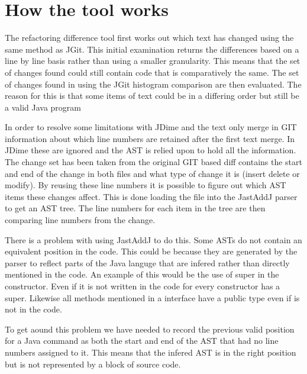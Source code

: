\section{How the tool works}

The refactoring difference tool first works out which text has changed using the same method as JGit.
This initial examination returns the differences based on a line by line basis rather than using a smaller granularity.
This means that the set of changes found could still contain code that is comparatively the same.
The set of changes found in using the JGit histogram comparison are then evaluated.
The reason for this is that some items of text could be in a differing order but still be a valid Java program


In order to resolve some limitations with JDime and the text only merge in GIT information about which line numbers are retained after the first text merge.  In JDime these are ignored and the AST is relied upon to hold all the information.  The change set has been taken from the original GIT based diff contains the start and end of the change in both files and what type of change it is (insert delete or modify).  By reusing these line numbers it is possible to figure out which AST items these changes affect. This is done loading the file into the JastAddJ parser to get an AST tree. The line numbers for each item in the tree are then comparing line numbers from the change.

There is a problem with using JastAddJ to do this. Some ASTs do not contain an equivalent position in the code.  This could be because they are generated by the parser to reflect parts of the Java languge that are infered rather than directly mentioned in the code.  An example of this would be the use of super in the constructor.  Even if it is not written in the code for every constructor has a super. Likewise all methods mentioned in a interface have a public type even if is not in the code.

To get aound this problem we have needed to record the previous valid position for a Java command as both the start and end of the AST that had no line numbers assigned to it.  This means that the infered AST is in the right position but is not represented by a block of source code.



